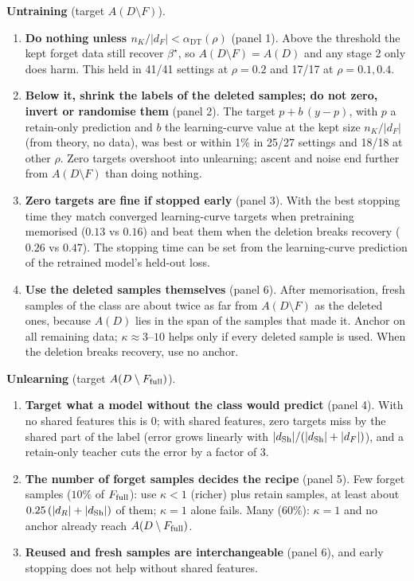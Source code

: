 \documentclass[10pt]{article}
\begin{document}
\textbf{Untraining} (target $A(D\setminus F)$).
\begin{enumerate}\setlength{\itemsep}{1pt}
\item \textbf{Do nothing unless $n_K/|d_F|<\alpha_{\mathrm{DT}}(\rho)$} (panel 1). Above the threshold the kept forget data still recover $\beta^\star$, so $A(D\setminus F)=A(D)$ and any stage 2 only does harm. This held in 41/41 settings at $\rho=0.2$ and 17/17 at $\rho=0.1,0.4$.
\item \textbf{Below it, shrink the labels of the deleted samples; do not zero, invert or randomise them} (panel 2). The target $p+b\,(y-p)$, with $p$ a retain-only prediction and $b$ the learning-curve value at the kept size $n_K/|d_F|$ (from theory, no data), was best or within 1\% in 25/27 settings and 18/18 at other $\rho$. Zero targets overshoot into unlearning; ascent and noise end further from $A(D\setminus F)$ than doing nothing.
\item \textbf{Zero targets are fine if stopped early} (panel 3). With the best stopping time they match converged learning-curve targets when pretraining memorised ($0.13$ vs $0.16$) and beat them when the deletion breaks recovery ($0.26$ vs $0.47$). The stopping time can be set from the learning-curve prediction of the retrained model's held-out loss.
\item \textbf{Use the deleted samples themselves} (panel 6). After memorisation, fresh samples of the class are about twice as far from $A(D\setminus F)$ as the deleted ones, because $A(D)$ lies in the span of the samples that made it. Anchor on all remaining data; $\kappa\approx3$--$10$ helps only if every deleted sample is used. When the deletion breaks recovery, use no anchor.
\end{enumerate}

\textbf{Unlearning} (target $A(D\setminus F_{\mathrm{full}})$).
\begin{enumerate}\setlength{\itemsep}{1pt}\setcounter{enumi}{4}
\item \textbf{Target what a model without the class would predict} (panel 4). With no shared features this is $0$; with shared features, zero targets miss by the shared part of the label (error grows linearly with $|d_{\mathrm{Sh}}|/(|d_{\mathrm{Sh}}|+|d_F|)$), and a retain-only teacher cuts the error by a factor of 3.
\item \textbf{The number of forget samples decides the recipe} (panel 5). Few forget samples ($10\%$ of $F_{\mathrm{full}}$): use $\kappa<1$ (richer) plus retain samples, at least about $0.25\,(|d_R|+|d_{\mathrm{Sh}}|)$ of them; $\kappa=1$ alone fails. Many ($60\%$): $\kappa=1$ and no anchor already reach $A(D\setminus F_{\mathrm{full}})$.
\item \textbf{Reused and fresh samples are interchangeable} (panel 6), and early stopping does not help without shared features.
\end{enumerate}
\end{document}
